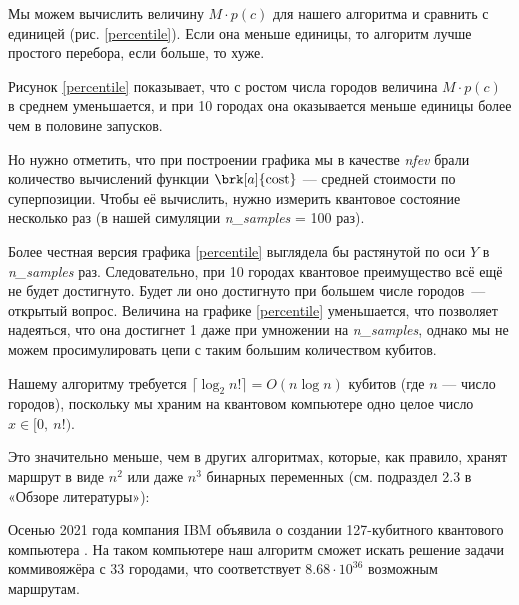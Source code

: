 Мы можем вычислить величину $M \cdot p(c)$ для нашего алгоритма и сравнить с единицей (рис. \ref{percentile}). Если она меньше единицы, то алгоритм лучше простого перебора, если больше, то хуже.


Рисунок \ref{percentile} показывает, что с ростом числа городов величина $M \cdot p(c)$ в среднем уменьшается, и при 10 городах она оказывается меньше единицы более чем в половине запусков. 

Но нужно отметить, что при построении графика мы в качестве \textsl{nfev} брали количество вычислений функции $\brk[a]{\text{cost}}$ --- средней стоимости по суперпозиции. Чтобы её вычислить, нужно измерить квантовое состояние несколько раз (в нашей симуляции \textsl{n\_samples} = 100 раз). 

Более честная версия графика \ref{percentile} выглядела бы растянутой по оси $Y$ в \textsl{n\_samples} раз. Следовательно, при 10 городах квантовое преимущество всё ещё не будет достигнуто. Будет ли оно достигнуто при большем числе городов~--- открытый вопрос. Величина на графике \ref{percentile} уменьшается, что позволяет надеяться, что она достигнет 1 даже при умножении на \textsl{n\_samples}, однако мы не можем просимулировать цепи с таким большим количеством кубитов.


Нашему алгоритму требуется $\lceil \log_2 n! \rceil = O(n \log n)$ кубитов (где $n$ --- число городов), поскольку мы храним на квантовом компьютере одно целое число $x \in [0,\ n!)$.

Это значительно меньше, чем в других алгоритмах, которые, как правило, хранят маршрут в виде $n^2$ или даже $n^3$ бинарных переменных (см. подраздел 2.3 в «Обзоре литературы»):


Осенью 2021 года компания IBM объявила о создании 127-кубитного квантового компьютера \cite{IBM-127}. На таком компьютере наш алгоритм сможет искать решение задачи коммивояжёра с 33 городами, что соответствует $8.68 \cdot 10^{36}$ возможным маршрутам.


